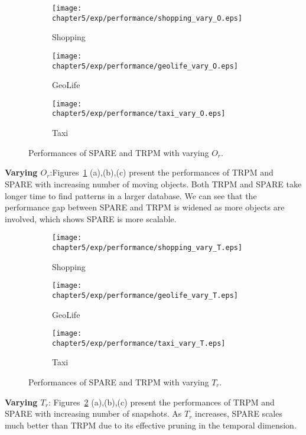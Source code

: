 \begin{figure}[h]
\centering
 \begin{subfigure}[b]{0.3\textwidth}
        \texttt{[image: chapter5/exp/performance/shopping\_vary\_O.eps]}
	     \caption{Shopping}	
 \end{subfigure}
 \begin{subfigure}[b]{0.3\textwidth}
        \texttt{[image: chapter5/exp/performance/geolife\_vary\_O.eps]}
        \caption{GeoLife}
    \end{subfigure}
 \begin{subfigure}[b]{0.3\textwidth}
      \texttt{[image: chapter5/exp/performance/taxi\_vary\_O.eps]}
      \caption{Taxi}
 \end{subfigure}
\caption{Performances of SPARE and TRPM with varying $O_r$.}
\label{exp:performance_vary_o}
\end{figure}


\textbf{Varying $O_r$}:Figures~\ref{exp:performance_vary_o} (a),(b),(c) present the performances of TRPM and SPARE with increasing number of moving objects. Both TRPM and SPARE take longer time to find patterns in a larger database. We can see that the performance gap between SPARE and TRPM is widened as more objects are involved, which shows SPARE is more scalable.

\begin{figure}[h]
\centering
 \begin{subfigure}[b]{0.3\textwidth}
        \texttt{[image: chapter5/exp/performance/shopping\_vary\_T.eps]}
	     \caption{Shopping}	
 \end{subfigure}
 \begin{subfigure}[b]{0.3\textwidth}
        \texttt{[image: chapter5/exp/performance/geolife\_vary\_T.eps]}
        \caption{GeoLife}
    \end{subfigure}
 \begin{subfigure}[b]{0.3\textwidth}
      \texttt{[image: chapter5/exp/performance/taxi\_vary\_T.eps]}
      \caption{Taxi}
 \end{subfigure}
\caption{Performances of SPARE and TRPM with varying $T_r$.}
\label{exp:performance_vary_t}
\end{figure}


\textbf{Varying $T_r$}: Figures~\ref{exp:performance_vary_t} (a),(b),(c) present 
the performances of TRPM and SPARE with increasing number of snapshots. 
As $T_r$ increases, SPARE scales much better than TRPM due to its effective pruning in the temporal dimension. 


